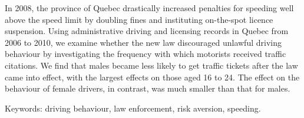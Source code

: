 

In 2008, the province of Quebec drastically increased penalties for speeding 
well above the speed limit by doubling fines and instituting on-the-spot licence suspension. 
Using administrative driving and licensing records in Quebec from 2006 to 2010, 
we examine whether the new law discouraged unlawful driving behaviour 
by investigating the frequency with which motorists received traffic citations. 
We find that males became less likely to get traffic tickets after the law came into effect, 
with the largest effects on those aged 16 to 24. 
The effect on the behaviour of female drivers, in contrast, was much smaller than that for males.

\medskip
\noindent
Keywords: driving behaviour, law enforcement, risk aversion, speeding.
